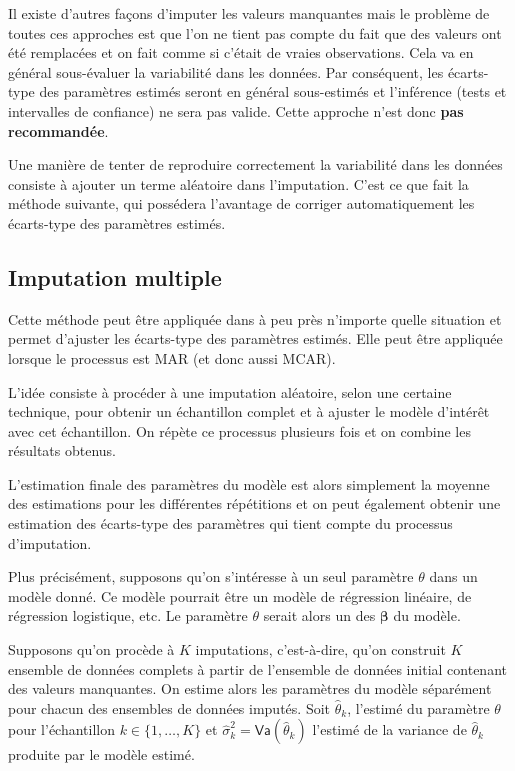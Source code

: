 \documentclass[
  11pt,
  letterpaper,
]{book}
\theoremstyle{definition}
\theoremstyle{remark}
\begin{document}
Il existe d'autres façons d'imputer les valeurs manquantes mais le
problème de toutes ces approches est que l'on ne tient pas compte du
fait que des valeurs ont été remplacées et on fait comme si c'était de
vraies observations. Cela va en général sous-évaluer la variabilité dans
les données. Par conséquent, les écarts-type des paramètres estimés
seront en général sous-estimés et l'inférence (tests et intervalles de
confiance) ne sera pas valide. Cette approche n'est donc \textbf{pas
recommandée}.

Une manière de tenter de reproduire correctement la variabilité dans les
données consiste à ajouter un terme aléatoire dans l'imputation. C'est
ce que fait la méthode suivante, qui possédera l'avantage de corriger
automatiquement les écarts-type des paramètres estimés.

\hypertarget{imputation-multiple}{%
\subsection{Imputation multiple}\label{imputation-multiple}}

Cette méthode peut être appliquée dans à peu près n'importe quelle
situation et permet d'ajuster les écarts-type des paramètres estimés.
Elle peut être appliquée lorsque le processus est MAR (et donc aussi
MCAR).

L'idée consiste à procéder à une imputation aléatoire, selon une
certaine technique, pour obtenir un échantillon complet et à ajuster le
modèle d'intérêt avec cet échantillon. On répète ce processus plusieurs
fois et on combine les résultats obtenus.

L'estimation finale des paramètres du modèle est alors simplement la
moyenne des estimations pour les différentes répétitions et on peut
également obtenir une estimation des écarts-type des paramètres qui
tient compte du processus d'imputation.

Plus précisément, supposons qu'on s'intéresse à un seul paramètre
\(\theta\) dans un modèle donné. Ce modèle pourrait être un modèle de
régression linéaire, de régression logistique, etc. Le paramètre
\(\theta\) serait alors un des \(\boldsymbol{\beta}\) du modèle.

Supposons qu'on procède à \(K\) imputations, c'est-à-dire, qu'on
construit \(K\) ensemble de données complets à partir de l'ensemble de
données initial contenant des valeurs manquantes. On estime alors les
paramètres du modèle séparément pour chacun des ensembles de données
imputés. Soit \(\widehat{\theta}_k\), l'estimé du paramètre \(\theta\)
pour l'échantillon \(k \in \{1, \ldots, K\}\) et
\(\widehat{\sigma}_k^2=\mathsf{Va}(\widehat{\theta}_k)\) l'estimé de la
variance de \(\widehat{\theta}_k\) produite par le modèle estimé.
\end{document}
